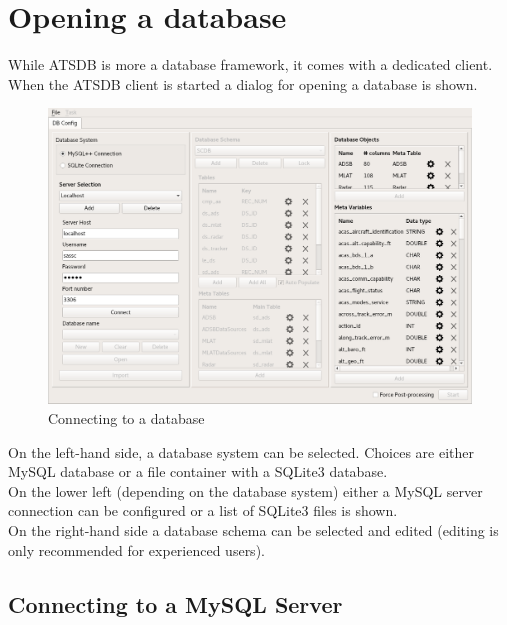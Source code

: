 \section{Opening a database}
\label{sec:startup}

While ATSDB is more a database framework, it comes with a dedicated client. When the ATSDB client is started a dialog  for opening a database is shown. 

\begin{figure}[H]
  \hspace*{-2cm}
    \includegraphics[width=18cm,frame]{../screenshots/db_config_connect.png}
  \caption{Connecting to a database}
  \label{fig:db_connect}
\end{figure}

On the left-hand side, a database system can be selected.  Choices are either MySQL database or a file container with a SQLite3 database. \\
On the lower left (depending on the database system) either a MySQL server connection can be configured or a list of SQLite3 files is shown.\\

On the right-hand side a database schema can be selected and edited (editing is only recommended for experienced users).

\subsection{Connecting to a MySQL Server}

